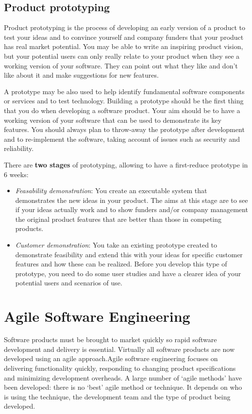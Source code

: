 \documentclass[10pt,a4paper]{report}
\begin{document}
\section{Product prototyping}
Product prototyping is the process of developing an early version of a product
to test your ideas and to convince yourself and company funders that your
product has real market potential.
You may be able to write an inspiring product vision, but your potential users can only
really relate to your product when they see a working version of your software. They can
point out what they like and don’t like about it and make suggestions for new features.

A prototype may be also used to help identify fundamental software components or
services and to test technology. Building a prototype should be the first thing that you do when developing a software product. Your aim should be to have a working version of your
software that can be used to demonstrate its key features. You should always plan to throw-away the prototype after development and to re-implement the software, taking account of issues such as security and reliability.

There are \textbf{two stages} of prototyping, allowing to have a first-reduce prototype in 6 weeks:
\begin{itemize}
	\item \textit{Feasability demonstration}: You create an executable system that
	demonstrates the new ideas in your product. The aims at this stage are
	to see if your ideas actually work and to show funders and/or company
	management the original product features that are better than those in
	competing products.
	
	\item \textit{Customer demonstration}:  You take an existing prototype created to
	demonstrate feasibility and extend this with your ideas for specific
	customer features and how these can be realized. Before you develop
	this type of prototype, you need to do some user studies and have a
	clearer idea of your potential users and scenarios of use.
\end{itemize} 

\chapter{Agile Software Engineering}
Software products must be brought to market quickly so rapid software development and delivery is essential. Virtually all software products are now developed using an agile approach.Agile software engineering focuses on delivering functionality quickly, responding to changing product specifications and minimizing
development overheads.
A large number of ‘agile methods’ have been developed: there is no ‘best’ agile method or technique. It depends on who is using the technique, the development team and the type of product being developed.
\end{document}
